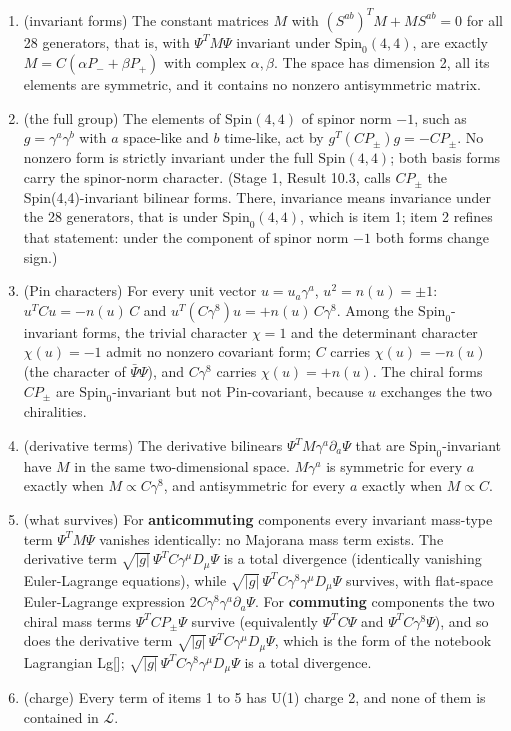 \documentclass[11pt]{article}
\begin{document}
\begin{enumerate}
\item (invariant forms) The constant matrices $M$ with $(S^{ab})^TM+MS^{ab}=0$ for all 28 generators, that is, with $\Psi^TM\Psi$ invariant under $\mathrm{Spin}_0(4,4)$, are exactly $M=C(\alpha P_-+\beta P_+)$ with complex $\alpha,\beta$. The space has dimension 2, all its elements are symmetric, and it contains no nonzero antisymmetric matrix.
\item (the full group) The elements of $\mathrm{Spin}(4,4)$ of spinor norm $-1$, such as $g=\gamma^a\gamma^b$ with $a$ space-like and $b$ time-like, act by $g^T(CP_\pm)g=-CP_\pm$. No nonzero form is strictly invariant under the full $\mathrm{Spin}(4,4)$; both basis forms carry the spinor-norm character. (Stage 1, Result 10.3, calls $CP_\pm$ the Spin(4,4)-invariant bilinear forms. There, invariance means invariance under the 28 generators, that is under $\mathrm{Spin}_0(4,4)$, which is item 1; item 2 refines that statement: under the component of spinor norm $-1$ both forms change sign.)
\item (Pin characters) For every unit vector $u=u_a\gamma^a$, $u^2=n(u)=\pm1$: $u^TCu=-n(u)\,C$ and $u^T(C\gamma^8)u=+n(u)\,C\gamma^8$. Among the $\mathrm{Spin}_0$-invariant forms, the trivial character $\chi=1$ and the determinant character $\chi(u)=-1$ admit no nonzero covariant form; $C$ carries $\chi(u)=-n(u)$ (the character of $\bar\Psi\Psi$), and $C\gamma^8$ carries $\chi(u)=+n(u)$. The chiral forms $CP_\pm$ are $\mathrm{Spin}_0$-invariant but not Pin-covariant, because $u$ exchanges the two chiralities.
\item (derivative terms) The derivative bilinears $\Psi^TM\gamma^a\partial_a\Psi$ that are $\mathrm{Spin}_0$-invariant have $M$ in the same two-dimensional space. $M\gamma^a$ is symmetric for every $a$ exactly when $M\propto C\gamma^8$, and antisymmetric for every $a$ exactly when $M\propto C$.
\item (what survives) For \textbf{anticommuting} components every invariant mass-type term $\Psi^TM\Psi$ vanishes identically: no Majorana mass term exists. The derivative term $\sqrt{|g|}\,\Psi^TC\gamma^\mu D_\mu\Psi$ is a total divergence (identically vanishing Euler-Lagrange equations), while $\sqrt{|g|}\,\Psi^TC\gamma^8\gamma^\mu D_\mu\Psi$ survives, with flat-space Euler-Lagrange expression $2C\gamma^8\gamma^a\partial_a\Psi$. For \textbf{commuting} components the two chiral mass terms $\Psi^TCP_\pm\Psi$ survive (equivalently $\Psi^TC\Psi$ and $\Psi^TC\gamma^8\Psi$), and so does the derivative term $\sqrt{|g|}\,\Psi^TC\gamma^\mu D_\mu\Psi$, which is the form of the notebook Lagrangian Lg[]; $\sqrt{|g|}\,\Psi^TC\gamma^8\gamma^\mu D_\mu\Psi$ is a total divergence.
\item (charge) Every term of items 1 to 5 has U(1) charge 2, and none of them is contained in $\mathcal L$.
\end{enumerate}
\end{document}
